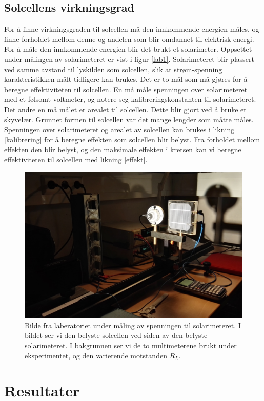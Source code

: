 \documentclass[%
 reprint,
 amsmath,amssymb,
 aps,
 norsk,
 booktabs
]{revtex4-1}
\begin{document}
\subsection{Solcellens virkningsgrad}
For å finne virkningsgraden til solcellen må den innkommende energien måles, og finne forholdet mellom denne og andelen som blir omdannet til elektrisk energi. For å måle den innkommende energien blir det brukt et solarimeter. Oppsettet under målingen av solarimeteret er vist i figur \vref{lab1}. Solarimeteret blir plassert ved samme avstand til lyskilden som solcellen, slik at strøm-spenning karakteristikken målt tidligere kan brukes. Det er to mål som må gjøres for å beregne effektiviteten til solcellen. En må måle spenningen over solarimeteret med et følsomt voltmeter, og notere seg kalibreringskonstanten til solarimeteret. Det andre en må målet er arealet til solcellen. Dette blir gjort ved å bruke et skyvelær. Grunnet formen til solcellen var det mange lengder som måtte måles. Spenningen over solarimeteret og arealet av solcellen kan brukes i likning \eqref{kalibrering} for å beregne effekten som solcellen blir belyst. Fra forholdet mellom effekten den blir belyst, og den maksimale effekten i kretsen kan vi beregne effektiviteten til solcellen med likning \eqref{effekt}.
\begin{figure}[h!]
  \centering
  \includegraphics[scale=0.065]{lab1.jpg}
  \caption{Bilde fra laberatoriet under måling av spenningen til solarimeteret. I bildet ser vi den belyste solcellen ved siden av den belyste solarimeteret. I bakgrunnen ser vi de to multimeterene brukt under eksperimentet, og den varierende motstanden $R_L$.}
  \label{lab1}
\end{figure}
\section{Resultater}
\end{document}
